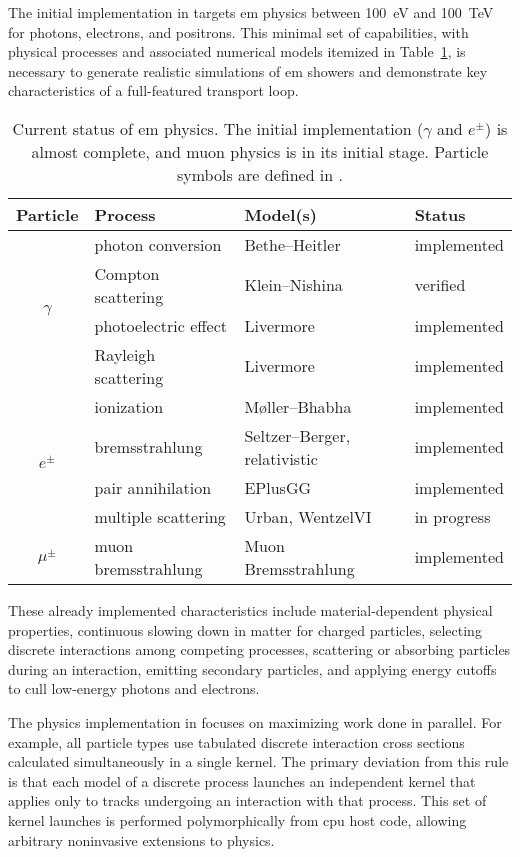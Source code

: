 The initial implementation in \celeritas targets \ac{em} physics between
\SI{100}{eV} and \SI{100}{TeV} for photons, electrons, and positrons. This
minimal set of capabilities, with physical processes and associated numerical
models itemized in Table~\ref{tab:em-physics}, is necessary to generate
realistic simulations of \ac{em} showers and demonstrate key characteristics of
a full-featured transport loop.
\begin{table}[h]
  \caption{Current status of \celeritas \acs{em} physics. The initial
  implementation ($\gamma$ and $e^\pm$) is almost complete, and muon physics is
  in its initial stage. Particle symbols are defined in
  \textcite{tanabashi_review_2018}.}
  \label{tab:em-physics}
  \centering
  \begin{tabular}{clll}\toprule Particle & Process & Model(s) & Status\\
    \midrule
    \multirow{4}{*}{$\gamma$}
    & photon conversion & Bethe--Heitler & implemented\\
    & Compton scattering & Klein--Nishina & verified\\
    & photoelectric effect & Livermore & implemented\\
    & Rayleigh scattering & Livermore & implemented\\
    \midrule
    \multirow{4}{*}{$e^\pm$}
    & ionization & M\o{}ller--Bhabha & implemented\\
    & bremsstrahlung & Seltzer--Berger, relativistic & implemented\\
    & pair annihilation & EPlusGG & implemented\\
    & multiple scattering & Urban, WentzelVI & in progress\\
    \midrule
    $\mu^\pm$ & muon bremsstrahlung & Muon Bremsstrahlung & implemented\\
    \bottomrule
  \end{tabular}
\end{table}
These already implemented characteristics include  material-dependent
physical properties,  continuous slowing down in matter for charged
particles,  selecting discrete interactions among competing processes,
 scattering or absorbing particles during an interaction, 
emitting secondary particles, and  applying energy cutoffs to cull
low-energy photons and electrons.

The physics implementation in \celeritas focuses on maximizing work done in
parallel. For example, all particle types use tabulated discrete interaction
cross sections calculated simultaneously in a single kernel. The primary
deviation from this rule is that each model of a discrete process launches an
independent kernel that applies only to tracks undergoing an interaction with
that process. This set of kernel launches is performed polymorphically from
\ac{cpu} host code, allowing arbitrary noninvasive extensions to \celeritas
physics.

